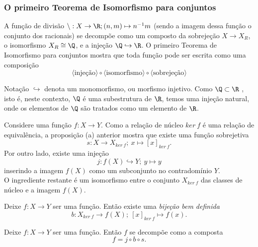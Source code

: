       \subsubsection{O primeiro Teorema de Isomorfismo para conjuntos}
         A função de divisão $\setminus: X\to \R; (n,m) \mapsto n^{-1}m$ (sendo a imagem dessa função o conjunto dos racionais) se decompõe como um composto da sobrejeção $X \to X_{R}$, o isomorfismo $X_{R} \cong \Q$, e a injeção $\Q \hookrightarrow \R$. O primeiro Teorema de Isomorfismo para conjuntos mostra que toda função pode ser escrita como uma composição $$\langle \textrm{injeção} \rangle \circ \langle \textrm{isomorfismo} \rangle \circ \langle \textrm{sobrejeção} \rangle $$
         \begin{mymdframed}{Notação}
            $\hookrightarrow$ denota um monomorfismo, ou morfismo injetivo. Como $\Q \subset \R$ , isto é, neste contexto, $\Q$ é uma subestrutura de $\R$, temos uma injeção natural, onde os elementos de $\Q$ são tratados como um elemento de $\R$.
         \end{mymdframed}
         Considere uma função $f: X\to Y$. Como a relação de núcleo $ker\ f$ é uma relação de equivalência, a proposição (a) anterior mostra que existe uma função sobrejetiva $$s: X\to X_{ker\ f};\ x\mapsto \left[x\right]_{ker\ f}.$$
         Por outro lado, existe uma injeção $$j: f(X) \hookrightarrow Y;\ y\mapsto y$$ inserindo a imagem $f(X)$ como um subconjunto no contradomínio $Y$.\\
         O ingrediente restante é um isomorfismo entre o conjunto $X_{ker\ f}$ das classes de núcleo e a imagem $f(X)$.
         \begin{stat}
            Deixe $f: X\to Y$ ser uma função. Então existe uma \emph{bijeção bem definida} $$ b: X_{ker\ f} \to f(X);\ \left[x\right]_{ker\ f} \mapsto f(x).$$
         \end{stat}
         \begin{theorem}
            Deixe $f: X\to Y$ ser uma função. Então $f$ se decompõe como a composta $$f = j\circ b \circ s.$$ 
         \end{theorem}
